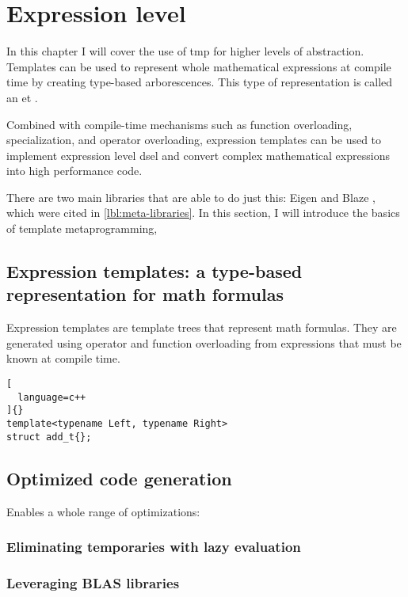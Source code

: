 \documentclass[../main]{subfiles}
\begin{document}
\section{
  Expression level
}
\label{lbl:expression-level-metaprogramming}

In this chapter I will cover the use of \acrshort{tmp} for higher levels
of abstraction. Templates can be used to represent whole mathematical
expressions at compile time by creating type-based arborescences.
This type of representation is called an \acrfull{et} \cite{veldhuizen:1995}.

Combined with compile-time mechanisms such as function overloading,
specialization, and operator overloading, expression templates can be used to
implement expression level \acrshort{dsel}\acrpluralsuffix{} and convert complex
mathematical expressions into high performance code.

There are two main libraries that are able to do just this: Eigen \cite{eigen}
and Blaze \cite{blazelib}, which were cited in \ref{lbl:meta-libraries}.
In this section, I will introduce the basics of \cpp template metaprogramming,

\subsection{
  Expression templates: a type-based representation for math formulas
}

Expression templates are template trees that represent math formulas.
They are generated using operator and function overloading from expressions
that must be known at compile time.

\begin{lstlisting}[
  language=c++
]{}
template<typename Left, typename Right>
struct add_t{};
\end{lstlisting}


\subsection{
  Optimized code generation
}

Enables a whole range of optimizations:

\subsubsection{
  Eliminating temporaries with lazy evaluation
}

\subsubsection{
  Leveraging BLAS libraries
}
\end{document}
